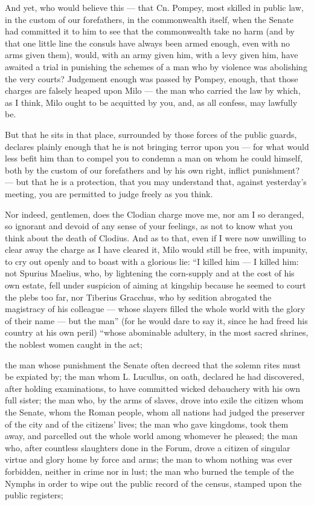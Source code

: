  And yet, who would believe this --- that Cn. Pompey, most skilled in public law, in the custom of our forefathers, in the commonwealth itself, when the Senate had committed it to him to see that the commonwealth take no harm (and by that one little line the consuls have always been armed enough, even with no arms given them), would, with an army given him, with a levy given him, have awaited a trial in punishing the schemes of a man who by violence was abolishing the very courts? Judgement enough was passed by Pompey, enough, that those charges are falsely heaped upon Milo --- the man who carried the law by which, as I think, Milo ought to be acquitted by you, and, as all confess, may lawfully be.

 But that he sits in that place, surrounded by those forces of the public guards, declares plainly enough that he is not bringing terror upon you --- for what would less befit him than to compel you to condemn a man on whom he could himself, both by the custom of our forefathers and by his own right, inflict punishment? --- but that he is a protection, that you may understand that, against yesterday's meeting, you are permitted to judge freely as you think.

 Nor indeed, gentlemen, does the Clodian charge move me, nor am I so deranged, so ignorant and devoid of any sense of your feelings, as not to know what you think about the death of Clodius. And as to that, even if I were now unwilling to clear away the charge as I have cleared it, Milo would still be free, with impunity, to cry out openly and to boast with a glorious lie: ``I killed him --- I killed him: not Spurius Maelius, who, by lightening the corn-supply and at the cost of his own estate, fell under suspicion of aiming at kingship because he seemed to court the plebs too far, nor Tiberius Gracchus, who by sedition abrogated the magistracy of his colleague --- whose slayers filled the whole world with the glory of their name --- but the man'' (for he would dare to say it, since he had freed his country at his own peril) ``whose abominable adultery, in the most sacred shrines, the noblest women caught in the act;

 the man whose punishment the Senate often decreed that the solemn rites must be expiated by; the man whom L. Lucullus, on oath, declared he had discovered, after holding examinations, to have committed wicked debauchery with his own full sister; the man who, by the arms of slaves, drove into exile the citizen whom the Senate, whom the Roman people, whom all nations had judged the preserver of the city and of the citizens' lives; the man who gave kingdoms, took them away, and parcelled out the whole world among whomever he pleased; the man who, after countless slaughters done in the Forum, drove a citizen of singular virtue and glory home by force and arms; the man to whom nothing was ever forbidden, neither in crime nor in lust; the man who burned the temple of the Nymphs in order to wipe out the public record of the census, stamped upon the public registers;

